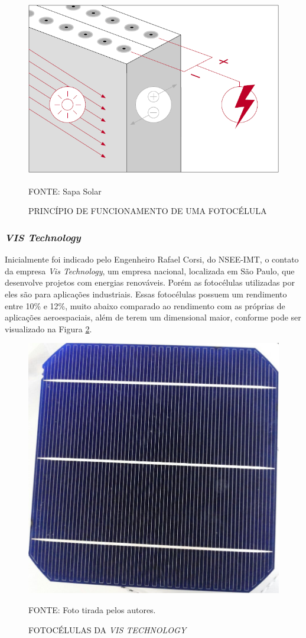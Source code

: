 \documentclass[
	12pt,				%
	openright,			%
	oneside,			%
	a4paper,			%
	english,			%
	french,				%
	spanish,			%
	brazil,				%
	oldfontcommands
	]{abntex2}
\begin{document}
	\begin{figure}[th]
		\caption{PRINCÍPIO DE FUNCIONAMENTO DE UMA FOTOCÉLULA}
		\label{Fig_PF_Cell}
		\centering
		\includegraphics[width=0.6\linewidth]{./figs/fotocelula}
			
		\begin{small}
			FONTE: Sapa Solar\textsuperscript{\cite{celula2}}
		\end{small}		
	\end{figure}

\subsubsection[VIS Technology]{\textit{VIS Technology}}
	
	Inicialmente foi indicado pelo Engenheiro Rafael Corsi, do NSEE-IMT, o contato da empresa \textit{Vis Technology}, um empresa nacional, localizada em São Paulo, que desenvolve projetos com energias renováveis. Porém as fotocélulas utilizadas por eles são para aplicações industriais. Essas fotocélulas possuem um rendimento entre 10\% e 12\%, muito abaixo comparado ao rendimento com as próprias de aplicações aeroespaciais, além de terem um dimensional maior, conforme pode ser visualizado na Figura \ref{Fig_Cell_Vis}.
	
	\begin{figure}[th]
		\caption{FOTOCÉLULAS DA \textit{VIS TECHNOLOGY}}
		\label{Fig_Cell_Vis}
		\centering
		\includegraphics[width=0.6\linewidth]{./figs/cell_vis}
			
		\begin{small}
			FONTE: Foto tirada pelos autores.
		\end{small}		
	\end{figure}
	
\end{document}

